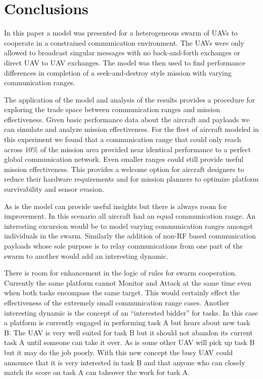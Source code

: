\chapter{Conclusions}
In this paper a model was presented for a heterogeneous swarm of UAVs to cooperate in a constrained communication environment.  The UAVs were only allowed to broadcast singular messages with no back-and-forth exchanges or direct UAV to UAV exchanges.  The model was then used to find performance differences in completion of a seek-and-destroy style mission with varying communication ranges.

The application of the model and analysis of the results provides a procedure for exploring the trade space between communication ranges and mission effectiveness.  Given basic performance data about the aircraft and payloads we can simulate and analyze mission effectiveness.  For the fleet of aircraft modeled in this experiment we found that a communication range that could only reach across $10\%$ of the mission area provided near identical performance to a perfect global communication network.  Even smaller ranges could still provide useful mission effectiveness.  This provides a welcome option for aircraft designers to reduce their hardware requirements and for mission planners to optimize platform survivability and sensor evasion.

As is the model can provide useful insights but there is always room for improvement.  In this scenario all aircraft had an equal communication range.  An interesting excursion would be to model varying communication ranges amongst individuals in the swarm.  Similarly the addition of non-RF based communication payloads whose sole purpose is to relay communications from one part of the swarm to another would add an interesting dynamic.

There is room for enhancement in the logic of rules for swarm cooperation.  Currently the same platform cannot Monitor and Attack at the same time even when both tasks encompass the same target.  This would certainly effect the effectiveness of the extremely small communication range cases.  Another interesting dynamic is the concept of an ``interested bidder'' for tasks.  In this case a platform is currently engaged in performing task A but hears about new task B.  The UAV is very well suited for task B but it should not abandon its current task A until someone can take it over.  As is some other UAV will pick up task B but it may do the job poorly.  With this new concept the busy UAV could announce that it is very interested in task B and that anyone who can closely match its score on task A can takeover the work for task A.



